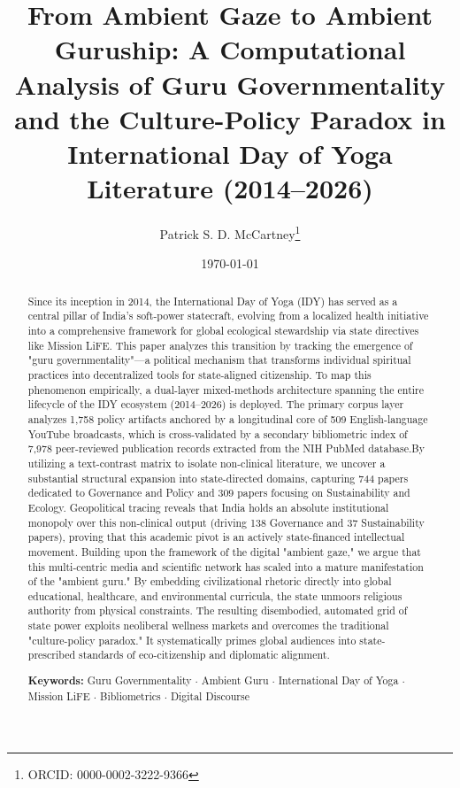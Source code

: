 \documentclass[11pt]{article}
\title{From Ambient Gaze to Ambient Guruship: A Computational Analysis of Guru Governmentality and the Culture-Policy Paradox in International Day of Yoga Literature (2014--2026)}
\author[1]{Patrick S. D. McCartney\thanks{ORCID: 0000-0002-3222-9366}}
\affil[1]{Nanzan University Anthropological Institute, Nagoya, Japan \\
 \small \href{mailto:u4556787@anu.edu.au}{u4556787@anu.edu.au}}
\affil[2]{Australian National University, Canberra, Australia}
\affil[3]{Manipal Academy of Higher Education, Manipal, India}
\date{\today}
\begin{document}
\maketitle




\begin{abstract}

Since its inception in 2014, the International Day of Yoga (IDY) has served as a central pillar of India’s soft-power statecraft, evolving from a localized health initiative into a comprehensive framework for global ecological stewardship via state directives like Mission LiFE. This paper analyzes this transition by tracking the emergence of "guru governmentality"—a political mechanism that transforms individual spiritual practices into decentralized tools for state-aligned citizenship. To map this phenomenon empirically, a dual-layer mixed-methods architecture spanning the entire lifecycle of the IDY ecosystem (2014–2026) is deployed. The primary corpus layer analyzes 1,758 policy artifacts anchored by a longitudinal core of 509 English-language YouTube broadcasts, which is cross-validated by a secondary bibliometric index of 7,978 peer-reviewed publication records extracted from the NIH PubMed database.By utilizing a text-contrast matrix to isolate non-clinical literature, we uncover a substantial structural expansion into state-directed domains, capturing 744 papers dedicated to Governance and Policy and 309 papers focusing on Sustainability and Ecology. Geopolitical tracing reveals that India holds an absolute institutional monopoly over this non-clinical output (driving 138 Governance and 37 Sustainability papers), proving that this academic pivot is an actively state-financed intellectual movement. Building upon the framework of the digital "ambient gaze," we argue that this multi-centric media and scientific network has scaled into a mature manifestation of the "ambient guru." By embedding civilizational rhetoric directly into global educational, healthcare, and environmental curricula, the state unmoors religious authority from physical constraints. The resulting disembodied, automated grid of state power exploits neoliberal wellness markets and overcomes the traditional "culture-policy paradox." It systematically primes global audiences into state-prescribed standards of eco-citizenship and diplomatic alignment.


\noindent \textbf{Keywords:} Guru Governmentality $\cdot$ Ambient Guru $\cdot$ International Day of Yoga $\cdot$ Mission LiFE $\cdot$ Bibliometrics $\cdot$ Digital Discourse
\end{abstract}
\end{document}
